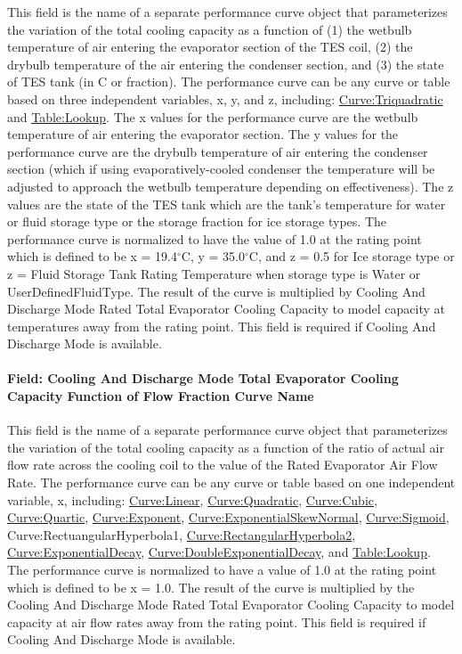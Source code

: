 This field is the name of a separate performance curve object that parameterizes the variation of the total cooling capacity as a function of (1) the wetbulb temperature of air entering the evaporator section of the TES coil, (2) the drybulb temperature of the air entering the condenser section, and (3) the state of TES tank (in C or fraction). The performance curve can be any curve or table based on three independent variables, x, y, and z, including: \hyperref[curvetriquadratic]{Curve:Triquadratic} and \hyperref[tablelookup]{Table:Lookup}. The x values for the performance curve are the wetbulb temperature of air entering the evaporator section. The y values for the performance curve are the drybulb temperature of air entering the condenser section (which if using evaporatively-cooled condenser the temperature will be adjusted to approach the wetbulb temperature depending on effectiveness). The z values are the state of the TES tank which are the tank's temperature for water or fluid storage type or the storage fraction for ice storage types. The performance curve is normalized to have the value of 1.0 at the rating point which is defined to be x = 19.4$^\circ$C, y = 35.0$^\circ$C, and z = 0.5 for Ice storage type or z = Fluid Storage Tank Rating Temperature when storage type is Water or UserDefinedFluidType. The result of the curve is multiplied by Cooling And Discharge Mode Rated Total Evaporator Cooling Capacity to model capacity at temperatures away from the rating point. This field is required if Cooling And Discharge Mode is available.

\paragraph{Field: Cooling And Discharge Mode Total Evaporator Cooling Capacity Function of Flow Fraction Curve Name}\label{field-cooling-and-discharge-mode-total-evaporator-cooling-capacity-function-of-flow-fraction-curve-name}

This field is the name of a separate performance curve object that parameterizes the variation of the total cooling capacity as a function of the ratio of actual air flow rate across the cooling coil to the value of the Rated Evaporator Air Flow Rate. The performance curve can be any curve or table based on one independent variable, x, including: \hyperref[curvelinear]{Curve:Linear}, \hyperref[curvequadratic]{Curve:Quadratic}, \hyperref[curvecubic]{Curve:Cubic}, \hyperref[curvequartic]{Curve:Quartic}, \hyperref[curveexponent]{Curve:Exponent}, \hyperref[curveexponentialskewnormal]{Curve:ExponentialSkewNormal}, \hyperref[curvesigmoid]{Curve:Sigmoid}, Curve:RectuangularHyperbola1, \hyperref[curverectangularhyperbola2]{Curve:RectangularHyperbola2}, \hyperref[curveexponentialdecay]{Curve:ExponentialDecay}, \hyperref[curvedoubleexponentialdecay]{Curve:DoubleExponentialDecay}, and \hyperref[tablelookup]{Table:Lookup}. The performance curve is normalized to have a value of 1.0 at the rating point which is defined to be x = 1.0. The result of the curve is multiplied by the Cooling And Discharge Mode Rated Total Evaporator Cooling Capacity to model capacity at air flow rates away from the rating point. This field is required if Cooling And Discharge Mode is available.

